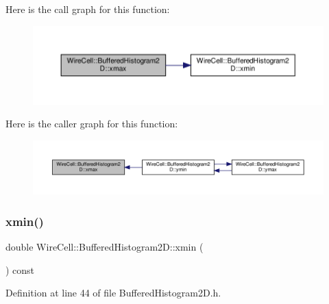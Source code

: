 Here is the call graph for this function\+:
\nopagebreak
\begin{figure}[H]
\begin{center}
\leavevmode
\includegraphics[width=350pt]{class_wire_cell_1_1_buffered_histogram2_d_ae993317d293e8e80541958c481e90977_cgraph}
\end{center}
\end{figure}
Here is the caller graph for this function\+:
\nopagebreak
\begin{figure}[H]
\begin{center}
\leavevmode
\includegraphics[width=350pt]{class_wire_cell_1_1_buffered_histogram2_d_ae993317d293e8e80541958c481e90977_icgraph}
\end{center}
\end{figure}
\mbox{\label{class_wire_cell_1_1_buffered_histogram2_d_a282c0f0144e547a7893760993461d4d7}} 
\subsubsection{\texorpdfstring{xmin()}{xmin()}}
{\footnotesize\ttfamily double Wire\+Cell\+::\+Buffered\+Histogram2\+D\+::xmin (\begin{DoxyParamCaption}{ }\end{DoxyParamCaption}) const\hspace{0.3cm}{\ttfamily [inline]}}



Definition at line 44 of file Buffered\+Histogram2\+D.\+h.

